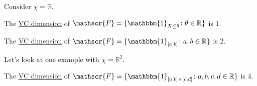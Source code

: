 Consider \(\chi = \mathbb{R} \).

\begin{eg}
	The \hyperref[def:VC-dimension]{VC dimension} of \(\mathscr{F} = \{ \mathbbm{1}_{X \leq \theta } \colon \theta \in \mathbb{R} \} \) is \(1\).
\end{eg}

\begin{eg}
	The \hyperref[def:VC-dimension]{VC dimension} of \(\mathscr{F} = \{ \mathbbm{1}_{[a, b]} \colon a, b \in \mathbb{R}  \} \) is \(2\).
\end{eg}

Let's look at one example with \(\chi = \mathbb{R} ^2\).
\begin{eg}
	The \hyperref[def:VC-dimension]{VC dimension} of \(\mathscr{F} = \{ \mathbbm{1}_{[a, b]\times [c, d]} \colon a, b , c, d\in \mathbb{R} \} \) is \(4\).
\end{eg}